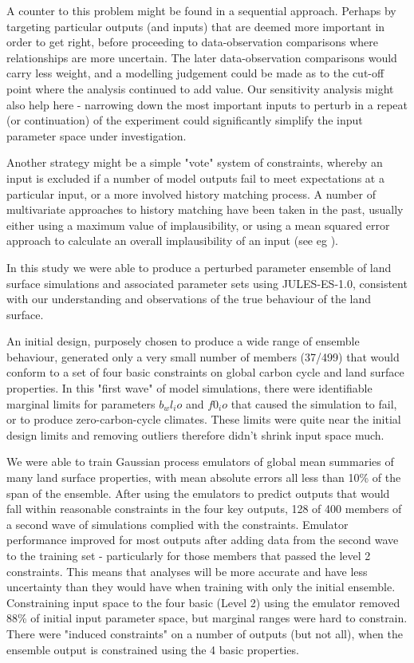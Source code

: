 \documentclass[gmd, manuscript]{copernicus}
\begin{document}
A counter to this problem might be found in a sequential approach. Perhaps by targeting particular outputs (and inputs) that are deemed more important in order to get right, before proceeding to data-observation comparisons where relationships are more uncertain. The later data-observation comparisons would carry less weight, and a modelling judgement could be made as to the cut-off point where the analysis continued to add value. Our sensitivity analysis might also help here - narrowing down the most important inputs to perturb in a repeat (or continuation) of the experiment could significantly simplify the input parameter space under investigation.

Another strategy might be a simple "vote" system of constraints, whereby an input is excluded if a number of model outputs fail to meet expectations at a particular input, or a more involved history matching process. A number of multivariate approaches to history matching have been taken in the past, usually either using a maximum value of implausibility, or using a mean squared error approach to calculate an overall implausibility of an input (see eg \cite{vernon2010galaxy}).

\label{sec:conclusions}  %

In this study we were able to produce a perturbed parameter ensemble of land surface simulations and associated parameter sets using JULES-ES-1.0, consistent with our understanding and observations of the true behaviour of the land surface. 

 An initial design, purposely chosen to produce a wide range of ensemble behaviour, generated only a very small number of members (37/499) that would conform to a set of four basic constraints on global carbon cycle and land surface properties. In this "first wave" of model simulations, there were identifiable marginal limits for parameters $b_wl_io$ and $f0_io$ that caused the simulation to fail, or to produce zero-carbon-cycle climates. These limits were quite near the initial design limits and removing outliers therefore didn't shrink input space much.
 
 We were able to train Gaussian process emulators of global mean summaries of many land surface properties, with mean absolute errors all less than 10\% of the span of the ensemble. After using the emulators to predict outputs that would fall within reasonable constraints in the four key outputs, 128 of 400 members of a second wave of simulations complied with the constraints. Emulator performance improved for most outputs after adding data from the second wave to the training set - particularly for those members that passed the level 2 constraints. This means that analyses will be more accurate and have less uncertainty than they would have when training with only the initial ensemble. Constraining input space to the four basic (Level 2) using the emulator removed 88\% of initial input parameter space, but marginal ranges were hard to constrain. There were "induced constraints" on a number of outputs (but not all), when the ensemble output is constrained using the 4 basic properties.
    
\end{document}
